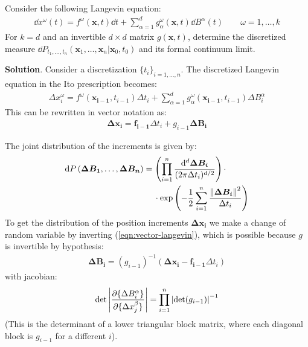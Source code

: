\documentclass[../template.tex]{subfiles}
\begin{document}
\begin{exo}
    Consider the following Langevin equation:
    \begin{align*}
        \dd{x^\omega}(t) = f^\omega(\bm{x},t) \dd{t} + \sum_{\alpha= 1}^d g_{\alpha}^\omega(\bm{x},t) \dd{B^\alpha(t)} \qquad \omega=1, \dots, k
    \end{align*}
    For $k = d$ and an invertible $d\times d$ matrix $g(\bm{x},t)$, determine the discretized measure $\dd{P}_{t_1, \dots, t_n}(\bm{x}_1, \dots, \bm{x}_n|\bm{x}_0, t_0)$ and its formal continuum limit.

    \medskip

    \textbf{Solution}.  Consider a discretization $\{t_i\}_{i=1,\dots, n}$. The discretized Langevin equation in the Ito prescription becomes:
    \begin{align*}
        \Delta x^\omega_i = f^\omega(\bm{x_{i-1}}, t_{i-1}) \Delta t_i + \sum_{\alpha = 1}^d g_\alpha^\omega(\bm{x_{i-1}}, t_{i-1}) \Delta B^\alpha_i
    \end{align*}
    This can be rewritten in vector notation as:
    \begin{align} \label{eqn:vector-langevin}
        \bm{\Delta x_i} = \bm{f_{i-1}} \Delta t_i+ g_{i-1} \bm{\Delta B_i}
    \end{align}

    The joint distribution of the increments is given by:
    \begin{align*}
        \dd{P}(\bm{\Delta B_1}, \dots,\bm{\Delta B_n}) &= \left(\prod_{i=1}^n \frac{\dd[d]{ \bm{\Delta B_i}}}{(2 \pi \Delta t_i)^{d/2}}   \right) \cdot\\
        &\quad \> \cdot \exp\left(-\frac{1}{2} \sum_{i=1}^n \frac{\norm{\bm{\Delta B_i}}^2 }{\Delta t_i}  \right)
    \end{align*}
    To get the distribution of the position increments $\bm{\Delta x_i}$ we make a change of random variable by inverting (\ref{eqn:vector-langevin}), which is possible because $g$ is invertible by hypothesis:
    \begin{align*}
        \bm{\Delta B_i} = (g_{i-1})^{-1}(\bm{\Delta x_i} - \bm{f_{i-1}}\Delta t_i)
    \end{align*} 
    with jacobian:
    \begin{align*}
        \operatorname{det}\left|\pdv{\{\Delta B_i^\alpha \}}{\{ \Delta x_j^\beta \}} \right| = \prod_{i=1}^n \left|\operatorname{det}(g_{i-1})\right|^{-1} 
    \end{align*}
    (This is the determinant of a lower triangular block matrix, where each diagonal block is $g_{i-1}$ for a different $i$).


\end{exo}
\end{document}
